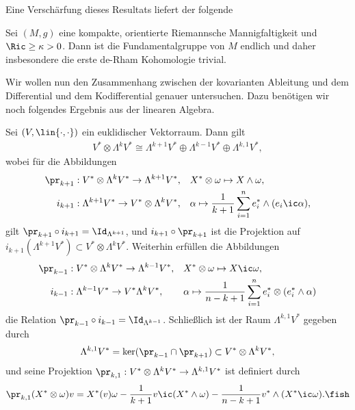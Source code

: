 \documentclass[%
	paper=a5,%
	fleqn,%
	DIV=18,%
	BCOR=0mm,
	fontsize=11pt,
	titlepage=false,%
	bibliography=totoc,
	DIV=18,%
	twoside=true,
	pdftitle=Riemannsche Geometrie,
	pdfauthor=Uwe Semmelmann,
	numbers=noendperiod]%
	{scrbook}
\begin{document}
Eine Verschärfung dieses Resultats liefert der folgende

\begin{prop}
Sei $(M,g)$ eine kompakte, orientierte Riemannsche Mannigfaltigkeit und $\Ric \ge \kappa > 0$. Dann ist die Fundamentalgruppe von $M$ endlich und daher insbesondere die erste de-Rham Kohomologie trivial.\fish
\end{prop}

Wir wollen nun den Zusammenhang zwischen der kovarianten Ableitung und dem Differential und dem Kodifferential genauer untersuchen. Dazu benötigen wir noch folgendes Ergebnis aus der linearen Algebra.

\begin{lem}
Sei $(V,\lin{\cdot,\cdot})$ ein euklidischer Vektorraum. Dann gilt
\begin{align*}
V^* \otimes \Lambda^k V^* \cong 
\Lambda^{k+1} V^*\oplus
\Lambda^{k-1} V^*\oplus
\Lambda^{k,1} V^*,
\end{align*}
wobei für die Abbildungen
\begin{align*}
\pr_{k+1} &: V^*\otimes \Lambda^k V^*\to \Lambda^{k+1}V^*, &&
X^*\otimes\omega\mapsto X\wedge\omega,\\
i_{k+1} &: \Lambda^{k+1}V^*\to V^*\otimes \Lambda^k V^*, && \alpha \mapsto
\frac{1}{k+1} \sum_{i=1}^n e_{i}^* \wedge (e_{i}\ic\alpha),
\end{align*}
gilt $\pr_{k+1}\circ i_{k+1}=\Id_{\Lambda^{k+1}}$, und $i_{k+1}\circ \pr_{k+1}$ ist die Projektion auf $i_{k+1}(\Lambda^{k+1}V^*) \subset V^*\otimes \Lambda^k V^*$. Weiterhin erfüllen die Abbildungen
\begin{align*}
\pr_{k-1} &: V^*\otimes \Lambda^k V^* \to \Lambda^{k-1}V^*,&& X^*\otimes \omega \mapsto X\ic \omega,\\
i_{k-1} &: \Lambda^{k-1}V^* \to V^*\Lambda^k V^*, &&
\alpha \mapsto \frac{1}{n-k+1} \sum_{i=1}^n e_{i}^* \otimes (e_{i}^*\wedge \alpha)
\end{align*}
die Relation $\pr_{k-1}\circ i_{k-1} = \Id_{\Lambda^{k-1}}$. Schließlich ist der Raum $\Lambda^{k,1}V^*$ gegeben durch
\begin{align*}
\Lambda^{k,1}V^* = \ker(\pr_{k-1}\cap \pr_{k+1}) \subset V^*\otimes \Lambda^k V^*,
\end{align*}
und seine Projektion $\pr_{k,1} :   V^*\otimes \Lambda^{k}V^* \to \Lambda^{k,1}V^*$ ist definiert durch
\begin{align*}
\pr_{k,1} (X^*\otimes \omega)v = 
X^*(v)\omega - \frac{1}{k+1}v\ic (X^*\wedge\omega) - \frac{1}{n-k+1} v^* \wedge(X^* \ic \omega).\fish
\end{align*}
\end{lem}
\end{document}

